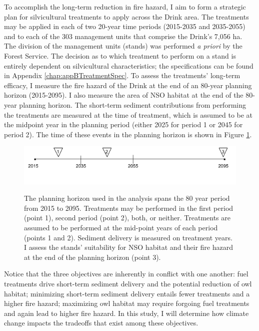 To accomplish the long-term reduction in fire hazard, I aim to form a strategic plan for silvicultural treatments to apply across the Drink area. The treatments may be applied in each of two 20-year time periods (2015-2035 and 2035-2055) and to each of the 303 management units that comprise the Drink's 7,056 ha. The division of the management units (stands) was performed \textit{a priori} by the Forest Service. The decision as to which treatment to perform on a stand is entirely dependent on silvicultural characteristics; the specifications can be found in Appendix \ref{chap:appBTreatmentSpec}. To assess the treatments' long-term efficacy, I measure the fire hazard of the Drink at the end of an 80-year planning horizon (2015-2095). I also measure the area of NSO habitat at the end of the 80-year planning horizon. The short-term sediment contributions from performing the treatments are measured at the time of treatment, which is assumed to be at the midpoint year in the planning period (either 2025 for period 1 or 2045 for period 2). The time of these events in the planning horizon is shown in Figure \ref{fig:drinkPlanningHorizon}.
\begin{figure}
\centering
\includegraphics[width=.75\textwidth]{../images/Drink_PlanningHorizon_Sketch}
\label{fig:drinkPlanningHorizon}
\caption[Planning horizon schematic]{The planning horizon used in the analysis spans the 80 year period from 2015 to 2095. Treatments may be performed in the first period (point 1), second period (point 2), both, or neither. Treatments are assumed to be performed at the mid-point years of each period (points 1 and 2). Sediment delivery is measured on treatment years. I assess the stands' suitability for NSO habitat and their fire hazard at the end of the planning horizon (point 3).}
\end{figure}

Notice that the three objectives are inherently in conflict with one another: fuel treatments drive short-term sediment delivery and the potential reduction of owl habitat; minimizing short-term sediment delivery entails fewer treatments and a higher fire hazard; maximizing owl habitat may require forgoing fuel treatments and again lead to higher fire hazard. In this study, I will determine how climate change impacts the tradeoffs that exist among these objectives.

